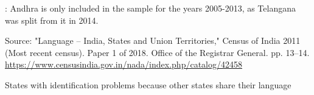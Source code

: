 \documentclass[doublespace,nopageskip]{UVAthesis}
\begin{document}
\begin{appendices}
\begin{table}[htbp]
\begin{threeparttable}
\begin{tablenotes}[flushleft]
\footnotesize
\item *: Andhra is only included in the sample for the years 2005-2013, as Telangana was split from it in 2014.
\item[Source:] "Language – India, States and Union Territories," Census of India 2011 (Most recent census). Paper 1 of 2018. Office of the Registrar General. pp. 13–14. \url{https://www.censusindia.gov.in/nada/index.php/catalog/42458}
\end{tablenotes}

\end{threeparttable}
\end{table}

\begin{table}[htbp]
\centering
\caption{States with identification problems because other states share their language}
\label{tab:language_fdi_a1}
\begin{threeparttable}
\footnotesize
{}


\end{threeparttable}
\end{table}
\end{appendices}
\end{document}
